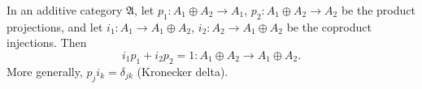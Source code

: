 In an additive category $\mathfrak{A}$, let $p_1: A_1 \oplus A_2 \to A_1$, $p_2: A_1 \oplus A_2 \to A_2$ be the product projections, and let $i_1: A_1 \to A_1 \oplus A_2$, $i_2: A_2 \to A_1 \oplus A_2$ be the coproduct injections. Then
$$i_1 p_1 + i_2 p_2 = 1: A_1 \oplus A_2 \to A_1 \oplus A_2.$$
More generally, $p_j i_k = \delta_{jk}$ (Kronecker delta).
